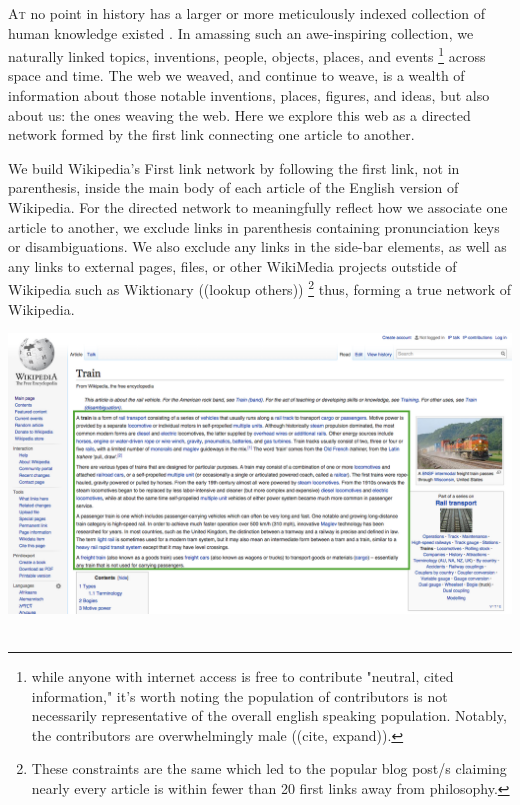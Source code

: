 \documentclass[twoside]{article}
\begin{document}
\begin{multicols}{2}

\lettrine[nindent=0em,lines=2]{A}t no point in history has a larger or more meticulously indexed collection of human knowledge existed \cite{1}. In amassing such an awe-inspiring collection, we naturally linked topics, inventions, people, objects, places, and events 
\footnote{while anyone with internet access is free to contribute "neutral, cited information," it's worth noting the population of contributors is not necessarily representative of the overall english speaking population. Notably, the contributors are overwhelmingly male ((cite, expand)).} across space and time. The web we weaved, and continue to weave, is a wealth of information about those notable inventions, places, figures, and ideas, but also about us: the ones weaving the web. Here we explore this web as a directed network formed by the first link connecting one article to another.

We build Wikipedia's First link network by following the first link, not in parenthesis, inside the main body of each article of the English version of Wikipedia. For the directed network to meaningfully reflect how we associate one article to another, we exclude links in parenthesis containing pronunciation keys or disambiguations. We also exclude any links in the side-bar elements, as well as any links to external pages, files, or other WikiMedia projects outstide of Wikipedia such as Wiktionary ((lookup others))
\footnote{
These constraints are the same which led to the popular blog post/s claiming nearly every article is within fewer than 20 first links away from philosophy. 
}
thus, forming a true network of Wikipedia.

\includegraphics[scale=0.18]{graphics/wiki_train.png}
\ \\


\end{multicols}
\end{document}
